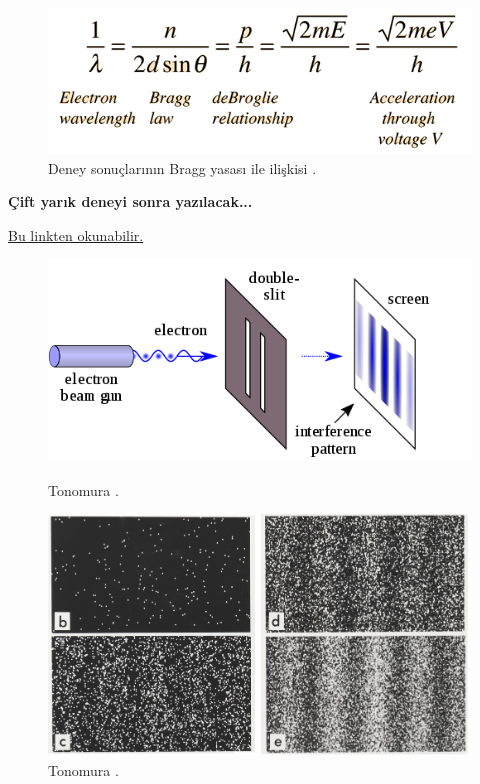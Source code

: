 \documentclass[a4paper,12pt, twoside]{article}
\begin{document}
\begin{figure}[hbtp]
\begin{minipage}{0.35\textwidth}
\vspace{24pt}

\includegraphics[scale=.4]{davisson_germer_hyperphysics_bragg.png}
\caption{\label{fig:davisson_germer5} Deney sonuçlarının Bragg yasası ile ilişkisi \cite{web:hyperphysics_davisson_germer1}.}
\end{minipage}
\end{figure}


\vspace{24pt}

{\bf Çift yarık deneyi sonra yazılacak...}

\href{https://tr.wikipedia.org/wiki/%C3%87ift_yar%C4%B1k_deneyi}{Bu linkten okunabilir. }

\begin{figure}[hbtp]
\center
\begin{minipage}{0.45\textwidth}
\includegraphics[scale=.4]{Double-slit.png}
\caption{Tonomura \cite{web:wiki_double_slit_experiment}.}
\label{fig:tonomura}
\end{minipage}
\begin{minipage}{0.45\textwidth}
\includegraphics[scale=.8]{Double-slit_experiment_results_Tonomura_2.jpg}
\caption{Tonomura \cite{web:wiki_double_slit_experiment}.}
\label{fig:tonomura1}
\end{minipage}
\end{figure}
\end{document}
